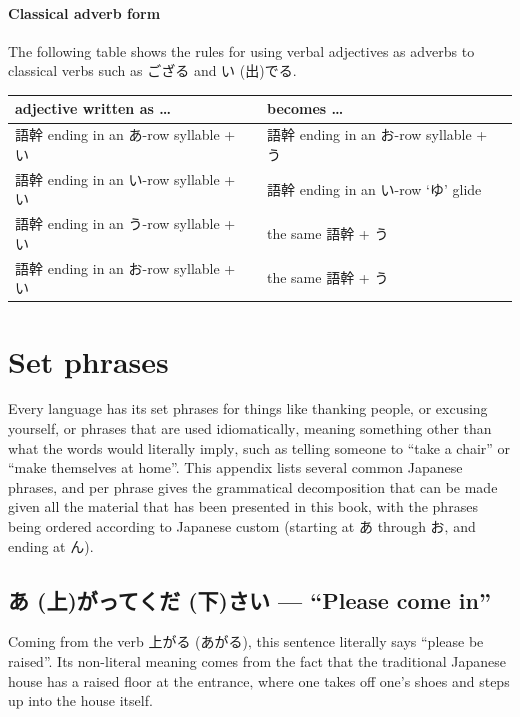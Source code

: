 \documentclass[11pt, b5paper, twoside, openright, onecolumn]{book}
\makeatletter
\newcommand*{\rubystack}[2]{{\relscale{0.5}%
  \begin{tabular}[b]{@{}c@{}}%
    {#1}\\%
   {\textscale{2}{#2}}%
  \end{tabular}}%
}
\DeclareRobustCommand*{\ruby}[2]{%
  \mbox{%
    \setlength{\parskip}{0ex}%
    \BeginAccSupp{method=pdfstringdef,ActualText={#1}}%
      \rubystack{\phantom{#2}}{#1}%
      \llap{%
        \rubystack{#2}{\phantom{#1}}%
      }%
    \EndAccSupp{}%
  }%
}
\renewcommand*{\ruby}[2]{#2 (#1)}%
\newenvironment{mytabularcentered}[1]{\noindent
\begin{center}\begin{tabular}[h]{#1}}{\end{tabular}\end{center}}
\newcommand{\nameheaders}[1]{
	\fancyhead{} %
	\fancyhead[RO,LE]{\thepage}
	\fancyhead[LO,RE]{\nouppercase{#1}}
	\pagestyle{fancy}}
\makeatother
\begin{document}
\subsubsection{Classical adverb form}


The following table shows the rules for using verbal adjectives as adverbs to classical verbs such as ござる and \ruby{出}{い}でる.

\vspace{0.5cm}
\smaller
\begin{center}
\begin{mytabularcentered}{| l  l |}\hline 
\rule{0pt}{2.4ex}adjective written as … & becomes …\\ 
\hline
\rule{0pt}{2.4ex}語幹 ending in an あ-row syllable + い & 語幹 ending in an お-row syllable + う\\ 
\rule{0pt}{2.4ex}語幹 ending in an い-row syllable + い & 語幹 ending in an い-row ‘ゆ’ glide\\ 
\rule{0pt}{2.4ex}語幹 ending in an う-row syllable + い & the same 語幹 + う\\ 
\rule{0pt}{2.4ex}語幹 ending in an お-row syllable + い & the same 語幹 + う\\ 
\hline 
\end{mytabularcentered}
\end{center}
\larger
\vspace{0.5cm}


\chapter{Set phrases}
\nameheaders{Set Phrases}

Every language has its set phrases for things like thanking people‚ or excusing yourself‚ or phrases that are used idiomatically‚ meaning something other than what the words would literally imply‚ such as telling someone to “take a chair” or “make themselves at home”. This appendix lists several common Japanese phrases‚ and per phrase gives the grammatical decomposition that can be made given all the material that has been presented in this book‚ with the phrases being ordered according to Japanese custom (starting at あ through お‚ and ending at ん).

\section*{\ruby{上}{あ}がって\ruby{下}{くだ}さい — “Please come in”}

Coming from the verb 上がる (あがる)‚ this sentence literally says “please be raised”. Its non-literal meaning comes from the fact that the traditional Japanese house has a raised floor at the entrance‚ where one takes off one’s shoes and steps up into the house itself.
\end{document}
